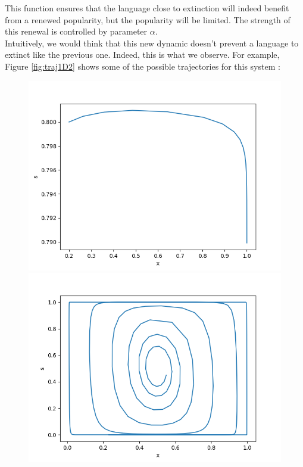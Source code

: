 \documentclass{article}
\begin{document}
This function ensures that the language close to extinction will indeed benefit from a renewed popularity, but the popularity will be limited.
The strength of this renewal is controlled by parameter $\alpha$. \\
Intuitively, we would think that this new dynamic doesn't prevent a language to extinct like the previous one.
Indeed, this is what we observe.
For example, Figure \ref{fig:traj1D2} shows some of the possible trajectories for this system :

\begin{figure}[H]
\centering
\includegraphics[scale=0.4]{traj1D202081e-3.png}
\includegraphics[scale=0.4]{traj1D20550451.png}

\end{figure}
\end{document}
